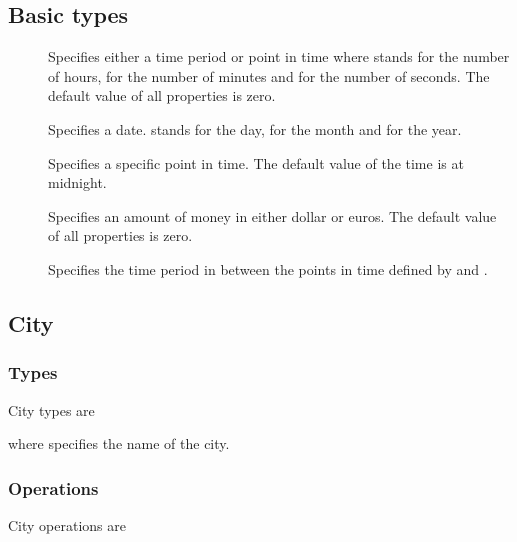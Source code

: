 \subsection{Basic types}
\begin{description}
  \item[] 

    Specifies either a time period or point in time where  stands for the
    number of hours,  for the number of minutes and  for the
    number of seconds. The default value of all properties is zero.
  \item[] 

    Specifies a date.  stands for the day,  for the month and
     for the year.
  \item[] 

    Specifies a specific point in time. The default value of the time is at
    midnight.
  \item[] 

    Specifies an amount of money in either dollar or euros. The default value of
    all properties is zero.
  \item[] 

    Specifies the time period in between the points in time defined by
     and .
\end{description}

\subsection{City}
\subsubsection{Types}
City types are
\begin{description}
  \item[] 
  \item[] 
\end{description}
where  specifies the name of the city. 

\subsubsection{Operations}
City operations are

